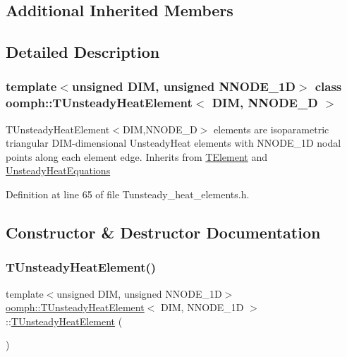 \subsection*{Additional Inherited Members}


\subsection{Detailed Description}
\subsubsection*{template$<$unsigned D\+IM, unsigned N\+N\+O\+D\+E\+\_\+1D$>$\newline
class oomph\+::\+T\+Unsteady\+Heat\+Element$<$ D\+I\+M, N\+N\+O\+D\+E\+\_\+D $>$}

T\+Unsteady\+Heat\+Element$<$\+D\+I\+M,\+N\+N\+O\+D\+E\+\_\+D$>$ elements are isoparametric triangular D\+I\+M-\/dimensional Unsteady\+Heat elements with N\+N\+O\+D\+E\+\_\+1D nodal points along each element edge. Inherits from \hyperlink{classoomph_1_1TElement}{T\+Element} and \hyperlink{classoomph_1_1UnsteadyHeatEquations}{Unsteady\+Heat\+Equations} 

Definition at line 65 of file Tunsteady\+\_\+heat\+\_\+elements.\+h.



\subsection{Constructor \& Destructor Documentation}
\mbox{\label{classoomph_1_1TUnsteadyHeatElement_a1ef76545b77561b462358a593d829844}} 
\subsubsection{\texorpdfstring{T\+Unsteady\+Heat\+Element()}{TUnsteadyHeatElement()}\hspace{0.1cm}{\footnotesize\ttfamily [1/2]}}
{\footnotesize\ttfamily template$<$unsigned D\+IM, unsigned N\+N\+O\+D\+E\+\_\+1D$>$ \\
\hyperlink{classoomph_1_1TUnsteadyHeatElement}{oomph\+::\+T\+Unsteady\+Heat\+Element}$<$ D\+IM, N\+N\+O\+D\+E\+\_\+1D $>$\+::\hyperlink{classoomph_1_1TUnsteadyHeatElement}{T\+Unsteady\+Heat\+Element} (\begin{DoxyParamCaption}{ }\end{DoxyParamCaption})\hspace{0.3cm}{\ttfamily [inline]}}




